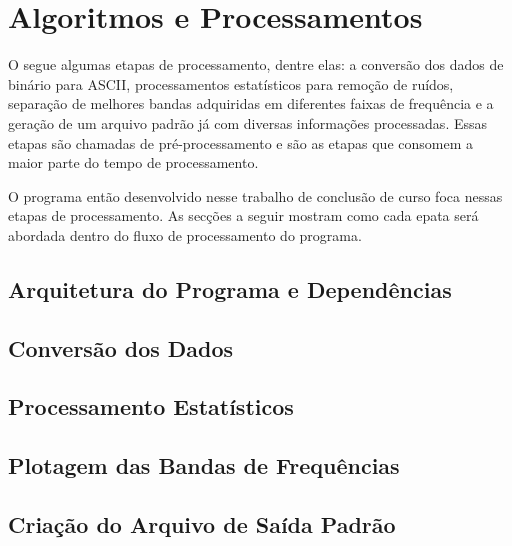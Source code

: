 \chapter{Algoritmos e Processamentos}
\label{cap-algoritmos}
    
    O \MT segue algumas etapas de processamento, dentre elas: a conversão dos dados de binário para ASCII, processamentos estatísticos para remoção de ruídos, separação de melhores bandas adquiridas em diferentes faixas de frequência e a geração de um arquivo padrão já com diversas informações processadas. Essas etapas são chamadas de pré-processamento e são as etapas que consomem a maior parte do tempo de processamento.
    
    O programa então desenvolvido nesse trabalho de conclusão de curso foca nessas etapas de processamento. As secções a seguir mostram como cada epata será abordada dentro do fluxo de processamento do programa.
    
    \section{Arquitetura do Programa e Dependências}
    \section{Conversão dos Dados}
    \section{Processamento Estatísticos}
    \section{Plotagem das Bandas de Frequências}
    \section{Criação do Arquivo de Saída Padrão}
    
    
    
